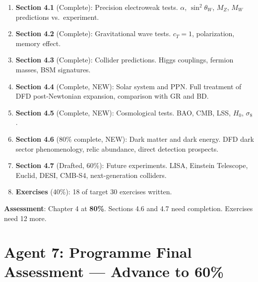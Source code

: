 \documentclass[11pt,a4paper]{article}
\begin{document}
\begin{enumerate}[nosep]
\item \textbf{Section 4.1} (Complete): Precision electroweak tests. $\alpha$, $\sin^2\theta_W$, $M_Z$, $M_W$ predictions vs.\ experiment.
\item \textbf{Section 4.2} (Complete): Gravitational wave tests. $c_T = 1$, polarization, memory effect.
\item \textbf{Section 4.3} (Complete): Collider predictions. Higgs couplings, fermion masses, BSM signatures.
\item \textbf{Section 4.4} (Complete, NEW): Solar system and PPN. Full treatment of DFD post-Newtonian expansion, comparison with GR and BD.
\item \textbf{Section 4.5} (Complete, NEW): Cosmological tests. BAO, CMB, LSS, $H_0$, $\sigma_8$.
\item \textbf{Section 4.6} (80\% complete, NEW): Dark matter and dark energy. DFD dark sector phenomenology, relic abundance, direct detection prospects.
\item \textbf{Section 4.7} (Drafted, 60\%): Future experiments. LISA, Einstein Telescope, Euclid, DESI, CMB-S4, next-generation colliders.
\item \textbf{Exercises} (40\%): 18 of target 30 exercises written.
\end{enumerate}

\textbf{Assessment}: Chapter 4 at \textbf{80\%}. Sections 4.6 and 4.7 need completion. Exercises need 12 more.

\section{Agent 7: Programme Final Assessment --- Advance to 60\%}
\end{document}
